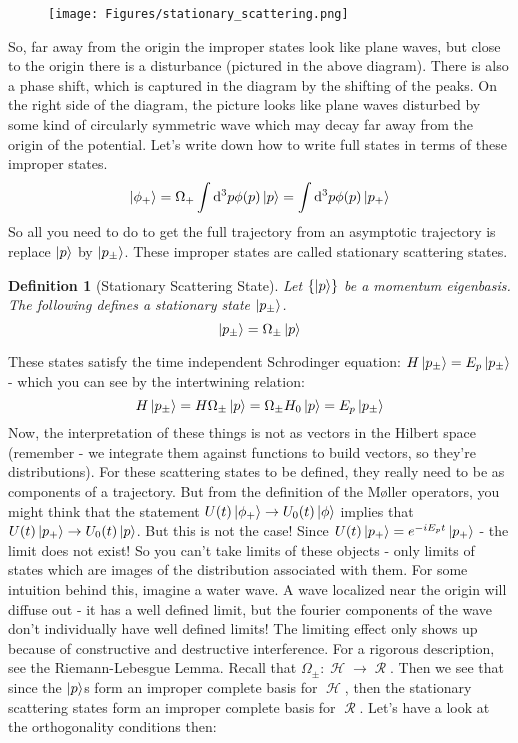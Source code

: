 \documentclass{article}
\DeclareMathOperator{\Hh}{{\mathcal{H}}}
\DeclareMathOperator{\Rr}{{\mathcal{R}}}
\newtheorem{defn}{Definition}
\begin{document}
\begin{figure}[ht]
    \centering
    \texttt{[image: Figures/stationary\_scattering.png]}
    \caption*{}
    \label{fig:stationary_sc}
\end{figure}

So, far away from the origin the improper states look like plane waves, but close to the origin there is a disturbance (pictured in the above diagram). There is also a phase shift, which is captured in the diagram by the shifting of the peaks. On the right side of the diagram, the picture looks like plane waves disturbed by some kind of circularly symmetric wave which may decay far away from the origin of the potential. Let's write down how to write full states in terms of these improper states.
\[\ket{\phi_+} = \Omega_+ \int \dd^3 p \phi(p)\ket{p} = \int \dd^3 p \phi(p)\ket{p_+}\]
So all you need to do to get the full trajectory from an asymptotic trajectory is replace $\ket{p}$ by $\ket{p_\pm}$. These improper states are called stationary scattering states.
\begin{defn}[Stationary Scattering State] Let $\{\ket{p}\}$ be a momentum eigenbasis. The following defines a stationary state $\ket{p_\pm}$.
\begin{equation}\ket{p_\pm} = \Omega_\pm \ket{p}\end{equation}
\end{defn}
These states satisfy the time independent Schrodinger equation: $H\ket{p_\pm} = E_p \ket{p_\pm}$ - which you can see by the intertwining relation:
\[H\ket{p_\pm} = H\Omega_\pm\ket{p} = \Omega_{\pm} H_0 \ket{p} = E_p \ket{p_\pm}\]
Now, the interpretation of these things is not as vectors in the Hilbert space (remember - we integrate them against functions to build vectors, so they're distributions). For these scattering states to be defined, they really need to be as components of a trajectory. But from the definition of the M\o ller operators, you might think that the statement $U(t)\ket{\phi_+} \to U_0(t)\ket{\phi}$ implies that $U(t)\ket{p_+} \to U_0(t)\ket{p}$. But this is not the case! Since $U(t)\ket{p_+} = e^{-iE_p t} \ket{p_+}$ - the limit does not exist! So you can't take limits of these objects - only limits of states which are images of the distribution associated with them. For some intuition behind this, imagine a water wave. A wave localized near the origin will diffuse out - it has a well defined limit, but the fourier components of the wave don't individually have well defined limits! The limiting effect only shows up because of constructive and destructive interference. For a rigorous description, see the Riemann-Lebesgue Lemma. Recall that $\Omega_\pm : \Hh \to\Rr$. Then we see that since the $\ket{p}$s form an improper complete basis for $\Hh$, then the stationary scattering states form an improper complete basis for $\Rr$. Let's have a look at the orthogonality conditions then:
\end{document}

